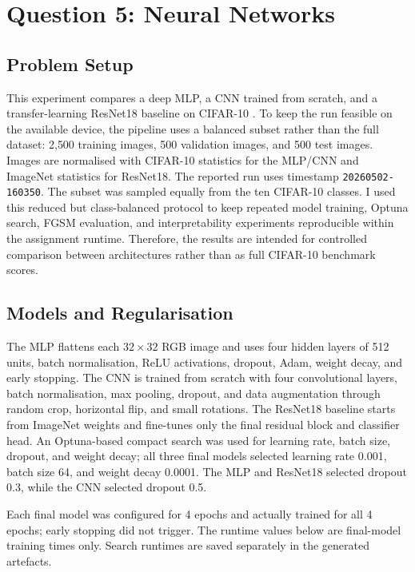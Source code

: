 \section{Question 5: Neural Networks}

\subsection{Problem Setup}

This experiment compares a deep MLP, a CNN trained from scratch, and a transfer-learning ResNet18 baseline on CIFAR-10 \cite{krizhevsky2009cifar}. To keep the run feasible on the available device, the pipeline uses a balanced subset rather than the full dataset: 2{,}500 training images, 500 validation images, and 500 test images. Images are normalised with CIFAR-10 statistics for the MLP/CNN and ImageNet statistics for ResNet18. The reported run uses timestamp \texttt{20260502-160350}. The subset was sampled equally from the ten CIFAR-10 classes. I used this reduced but class-balanced protocol to keep repeated model training, Optuna search, FGSM evaluation, and interpretability experiments reproducible within the assignment runtime. Therefore, the results are intended for controlled comparison between architectures rather than as full CIFAR-10 benchmark scores.

\subsection{Models and Regularisation}

The MLP flattens each $32\times32$ RGB image and uses four hidden layers of 512 units, batch normalisation, ReLU activations, dropout, Adam, weight decay, and early stopping. The CNN is trained from scratch with four convolutional layers, batch normalisation, max pooling, dropout, and data augmentation through random crop, horizontal flip, and small rotations. The ResNet18 baseline \cite{he2016resnet} starts from ImageNet weights and fine-tunes only the final residual block and classifier head. An Optuna-based compact search was used for learning rate, batch size, dropout, and weight decay; all three final models selected learning rate 0.001, batch size 64, and weight decay 0.0001. The MLP and ResNet18 selected dropout 0.3, while the CNN selected dropout 0.5.

Each final model was configured for 4 epochs and actually trained for all 4 epochs; early stopping did not trigger. The runtime values below are final-model training times only. Search runtimes are saved separately in the generated artefacts.

